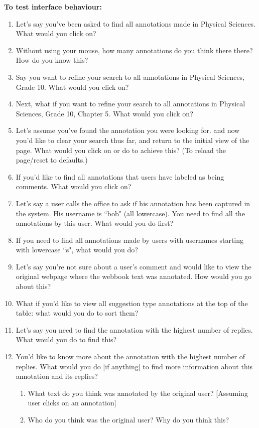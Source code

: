 \textbf{To test interface behaviour:}
\begin{enumerate}
 \item Let's say you've been asked to find all annotations made in Physical Sciences. What would you click on?
 \item Without using your mouse, how many annotations do you think there there? How do you know this?
 \item Say you want to refine your search to all annotations in Physical Sciences, Grade 10. What would you click on?
 \item Next, what if you want to refine your search to all annotations in Physical Sciences, Grade 10, Chapter 5. What would you click on?
 \item Let's assume you've found the annotation you were looking for. and now you'd like to clear your search thus far, and return to the initial view of the page. What would you click on or do to achieve this? (To reload the page/reset to defaults.)
 \item If you'd like to find all annotations that users have labeled as being comments. What would you click on?
 \item Let's say a user calls the office to ask if his annotation has been captured in the system. His username is ``bob" (all lowercase). You need to find all the annotations by this user. What would you do first?
 \item If you need to find all annotations made by users with usernames starting with lowercase ``s", what would you do?
 \item Let's say you're not sure about a user's comment and would like to view the original webpage where the webbook text was annotated. How would you go about this?
 \item What if you'd like to view all suggestion type annotations at the top of the table:  what would you do to sort them? 
 \item Let's say you need to find the annotation with the highest number of replies. What would you do to find this?
 \item You'd like to know more about the annotation with the highest number of replies. What would you do [if anything] to find more information about this annotation and its replies? 
 \begin{enumerate}
 \item  What text do you think was annotated by the original user? [Assuming user clicks on an annotation]
 \item Who do you think was the original user? Why do you think this?

\end{enumerate}
\end{enumerate}
